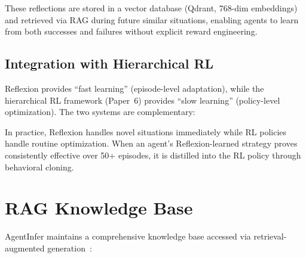 \documentclass[conference,10pt,letterpaper]{IEEEtran}
\begin{document}
These reflections are stored in a vector database (Qdrant, 768-dim embeddings) and retrieved via RAG during future similar situations, enabling agents to learn from both successes and failures without explicit reward engineering.

\subsection{Integration with Hierarchical RL}

Reflexion provides ``fast learning'' (episode-level adaptation), while the hierarchical RL framework (Paper~6) provides ``slow learning'' (policy-level optimization). The two systems are complementary:

\begin{table}[!t]
\caption{Reflexion vs.\ Hierarchical RL Comparison}
\label{tab:reflexion_rl}
\centering\scriptsize
{}
\end{table}

In practice, Reflexion handles novel situations immediately while RL policies handle routine optimization. When an agent's Reflexion-learned strategy proves consistently effective over 50+ episodes, it is distilled into the RL policy through behavioral cloning.

\section{RAG Knowledge Base}
\label{sec:rag}

AgentInfer maintains a comprehensive knowledge base accessed via retrieval-augmented generation~\cite{lewis2020rag}:
\end{document}
